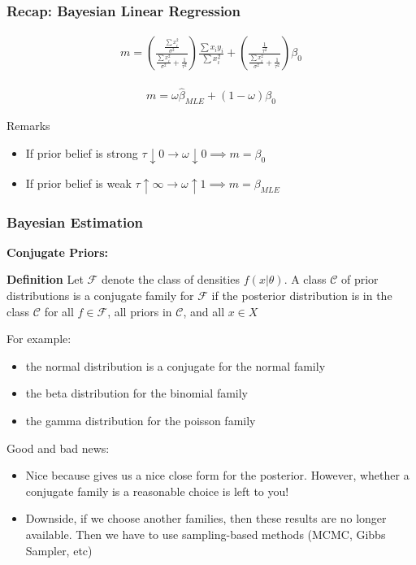 \documentclass[
  shownotes,
  xcolor={svgnames},
  hyperref={colorlinks,citecolor=DarkBlue,linkcolor=DarkRed,urlcolor=DarkBlue}
  ]{beamer}
\begin{document}
\begin{frame}[fragile]
\frametitle{Recap: Bayesian Linear Regression }

\begin{align}
m=\left(\frac{\frac{\sum x_i^2}{\sigma^2}}{\frac{\sum x_i^2}{\sigma^2}+\frac{1}{\tau^2}}\right)\frac{\sum x_iy_i}{\sum x_i^2} + \left(\frac{\frac{1}{\tau^2}}{\frac{\sum x_i^2}{\sigma^2}+\frac{1}{\tau^2}}\right)\beta_0
\end{align}

\medskip

\begin{align}
m = \omega \hat \beta_{MLE} + (1-\omega) \beta_0
\end{align}

Remarks 

\begin{itemize}
  \item If prior belief is strong $\tau \downarrow 0 \rightarrow \omega \downarrow 0 \implies m=\beta_0$ 
  \item If prior belief is weak $\tau \uparrow \infty \rightarrow \omega \uparrow 1 \implies m=\beta_{MLE}$ 

\end{itemize}



\end{frame}

\begin{frame}[fragile]
\frametitle{Bayesian Estimation}
{\bf Conjugate Priors:}

{\bf Definition}
Let $\mathcal{F}$ denote the class of densities $f(x|\theta)$. A class $\mathcal{C}$ of prior distributions is a conjugate family for $\mathcal{F}$ if the posterior distribution is in the class $\mathcal{C}$ for all $f\in\mathcal{F}$, all priors in $\mathcal{C}$, and all $x\in X$

\medskip

For example:

\begin{itemize}
  \item the normal distribution is a conjugate for the normal family
  \item the beta distribution for the binomial family
  \item the gamma distribution for the poisson family
\end{itemize}

\medskip
Good and bad news:
\begin{itemize}
\item Nice because gives us a nice close form for the posterior. However, whether a conjugate family is a reasonable choice is left to you!
\item Downside, if we choose another families, then these results are no longer available. Then we have to use sampling-based methods (MCMC, Gibbs Sampler, etc)
\end{itemize}


\end{frame}
\end{document}
